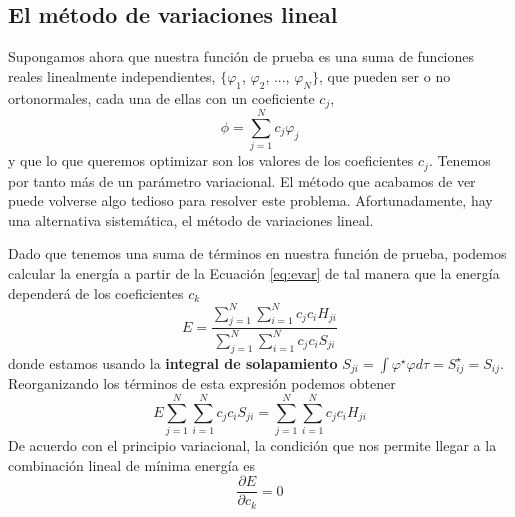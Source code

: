 \documentclass{tufte-handout}
\begin{document}
\subsection{El método de variaciones lineal}
Supongamos ahora que nuestra función de prueba es una
suma de funciones reales linealmente independientes,
$\{\varphi_1$, $\varphi_2$, ..., $\varphi_N\}$, que
pueden ser o no ortonormales, cada una de ellas con
un coeficiente $c_j$,
\begin{equation}
    \phi=\sum_{j=1}^{N}c_j\varphi_j
\end{equation}
y que lo que queremos optimizar son los valores de los 
coeficientes $c_j$. Tenemos por tanto más de un parámetro 
variacional. El método que acabamos de ver puede volverse 
algo tedioso para resolver este problema. Afortunadamente,
hay una alternativa sistemática, el método de variaciones lineal. 
 
Dado que tenemos una suma de términos en nuestra función de
prueba, podemos calcular la energía a partir de la Ecuación
\ref{eq:evar} de tal manera que la energía dependerá de los
coeficientes $c_k$
\begin{equation}
    E=\frac{\sum_{j=1}^N\sum_{i=1}^Nc_jc_iH_{ji}}{\sum_{j=1}^N\sum_{i=1}^N c_j c_iS_{ji}}
\end{equation}
donde estamos usando la \textbf{integral de solapamiento}
$S_{ji}=\int \varphi^\star\varphi d\tau=S^\star_{ij}=S_{ij}$.
Reorganizando los términos de esta expresión podemos obtener 
\begin{equation}
    E\sum_{j=1}^N\sum_{i=1}^N c_j c_iS_{ji}=\sum_{j=1}^N\sum_{i=1}^Nc_jc_iH_{ji}
\end{equation}
De acuerdo con el principio variacional, la condición que nos 
permite llegar a la combinación lineal de mínima energía es
\begin{equation}
    \frac{\partial E}{\partial c_k}=0
    \label{eq:var_deriv}
\end{equation}
\end{document}
